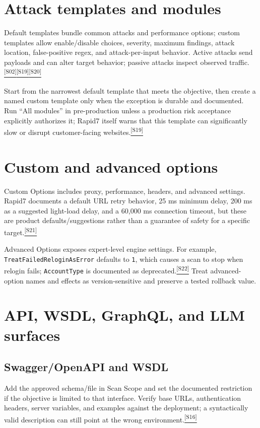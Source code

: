 \documentclass[11pt,letterpaper,oneside]{scrreprt}
\newcommand{\src}[1]{\hyperref[src:#1]{\textsuperscript{\color{R7Orange}[#1]}}}
\newcommand{\code}[1]{\texttt{#1}}
\begin{document}
\section{Attack templates and modules}
Default templates bundle common attacks and performance options; custom templates allow enable/disable choices, severity, maximum findings, attack location, false-positive regex, and attack-per-input behavior. Active attacks send payloads and can alter target behavior; passive attacks inspect observed traffic.\src{S02}\src{S19}\src{S20}

\begin{oprec}
Start from the narrowest default template that meets the objective, then create a named custom template only when the exception is durable and documented. Run ``All modules'' in pre-production unless a production risk acceptance explicitly authorizes it; Rapid7 itself warns that this template can significantly slow or disrupt customer-facing websites.\src{S19}
\end{oprec}

\section{Custom and advanced options}
Custom Options includes proxy, performance, headers, and advanced settings. Rapid7 documents a default URL retry behavior, 25 ms minimum delay, 200 ms as a suggested light-load delay, and a 60,000 ms connection timeout, but these are product defaults/suggestions rather than a guarantee of safety for a specific target.\src{S21}

Advanced Options exposes expert-level engine settings. For example, \code{TreatFailedReloginAsError} defaults to \code{1}, which causes a scan to stop when relogin fails; \code{AccountType} is documented as deprecated.\src{S22} Treat advanced-option names and effects as version-sensitive and preserve a tested rollback value.

\section{API, WSDL, GraphQL, and LLM surfaces}
\subsection{Swagger/OpenAPI and WSDL}
Add the approved schema/file in Scan Scope and set the documented restriction if the objective is limited to that interface. Verify base URLs, authentication headers, server variables, and examples against the deployment; a syntactically valid description can still point at the wrong environment.\src{S16}
\end{document}
